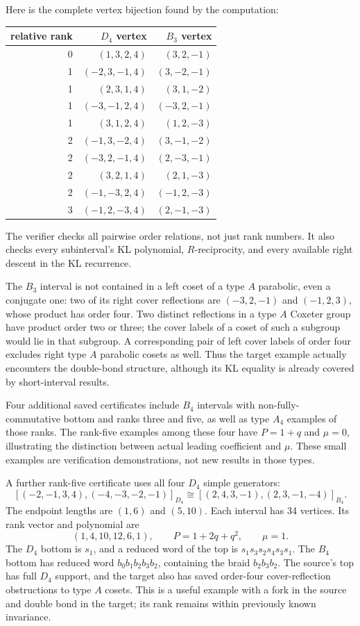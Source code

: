 \documentclass[11pt]{article}
\theoremstyle{definition}\newtheorem{definition}[theorem]{Definition}
\theoremstyle{remark}\newtheorem{remark}[theorem]{Remark}
\begin{document}
Here is the complete vertex bijection found by the computation:
\begin{center}\small
\begin{tabular}{rrr}
\toprule
relative rank&$D_4$ vertex&$B_3$ vertex\\
\midrule
0&$(1,3,2,4)$&$(3,2,-1)$\\
1&$(-2,3,-1,4)$&$(3,-2,-1)$\\
1&$(2,3,1,4)$&$(3,1,-2)$\\
1&$(-3,-1,2,4)$&$(-3,2,-1)$\\
1&$(3,1,2,4)$&$(1,2,-3)$\\
2&$(-1,3,-2,4)$&$(3,-1,-2)$\\
2&$(-3,2,-1,4)$&$(2,-3,-1)$\\
2&$(3,2,1,4)$&$(2,1,-3)$\\
2&$(-1,-3,2,4)$&$(-1,2,-3)$\\
3&$(-1,2,-3,4)$&$(2,-1,-3)$\\
\bottomrule
\end{tabular}\end{center}
The verifier checks all pairwise order relations, not just rank numbers.
It also checks every subinterval's KL polynomial, $R$-reciprocity,
and every available right descent in the KL recurrence.

The $B_3$ interval is not contained in a left coset of a type $A$
parabolic, even a conjugate one: two of its right cover reflections
are $(-3,2,-1)$ and $(-1,2,3)$, whose product has order four.
Two distinct reflections in a type $A$ Coxeter group have product
order two or three; the cover labels of a coset of such a subgroup
would lie in that subgroup. A corresponding pair of left cover labels
of order four excludes right type $A$ parabolic cosets as well.
Thus the target example actually encounters the double-bond structure,
although its KL equality is already covered by short-interval results.

Four additional saved certificates include $B_4$ intervals with non-fully-
commutative bottom and ranks three and five, as well as type $A_4$
examples of those ranks. The rank-five examples among these four have $P=1+q$ and
$\mu=0$, illustrating the distinction between actual leading
coefficient and $\mu$. These small examples are verification
demonstrations, not new results in those types.

A further rank-five certificate uses all four $D_4$ simple generators:
\[
 [(-2,-1,3,4),(-4,-3,-2,-1)]_{D_4}
 \cong [(2,4,3,-1),(2,3,-1,-4)]_{B_4}.
\]
The endpoint lengths are $(1,6)$ and $(5,10)$. Each interval has
34 vertices. Its rank vector and polynomial are
\[
 (1,4,10,12,6,1),\qquad P=1+2q+q^2,\qquad \mu=1.
\]
The $D_4$ bottom is $s_1$, and a reduced word of the top is
$s_1s_3s_2s_4s_3s_1$. The $B_4$ bottom has reduced word
$b_0b_1b_2b_3b_2$, containing the braid $b_2b_3b_2$.
The source's top has full $D_4$ support, and the target also has
saved order-four cover-reflection obstructions to type $A$ cosets.
This is a useful example with a fork in the source and double bond
in the target; its rank remains within previously known invariance.
\end{document}
